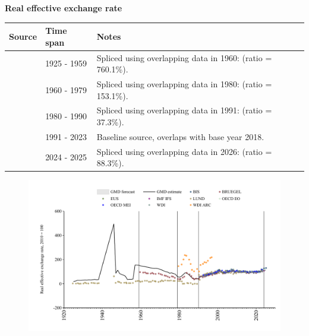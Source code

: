 \documentclass[12pt,a4paper,landscape]{article}
\begin{document}
\begin{adjustbox}{max totalsize={\paperwidth}{\paperheight},center}
\begin{minipage}[t][\textheight][t]{\textwidth}
\vspace*{0.5cm}
{}
\begin{center}
{\Large\bfseries Real effective exchange rate}
\end{center}
\vspace{0.5cm}
\begin{table}[H]
\centering
\small
\begin{tabular}{|l|l|l|}
\hline
\textbf{Source} & \textbf{Time span} & \textbf{Notes} \\
\hline
\rowcolor{white}\cite{LUND}& 1925 - 1959 &Spliced using overlapping data in 1960: (ratio = 760.1\%). \\
\rowcolor{lightgray}\cite{BRUEGEL}& 1960 - 1979 &Spliced using overlapping data in 1980: (ratio = 153.1\%). \\
\rowcolor{white}\cite{WDI_ARC}& 1980 - 1990 &Spliced using overlapping data in 1991: (ratio = 37.3\%). \\
\rowcolor{lightgray}\cite{WDI}& 1991 - 2023 &Baseline source, overlaps with base year 2018. \\
\rowcolor{white}\cite{BIS}& 2024 - 2025 &Spliced using overlapping data in 2026: (ratio = 88.3\%). \\
\hline
\end{tabular}
\end{table}
\begin{figure}[H]
\centering
\includegraphics[width=\textwidth,height=0.6\textheight,keepaspectratio]{graphs/POL_REER.pdf}
\end{figure}
\end{minipage}
\end{adjustbox}
\end{document}
